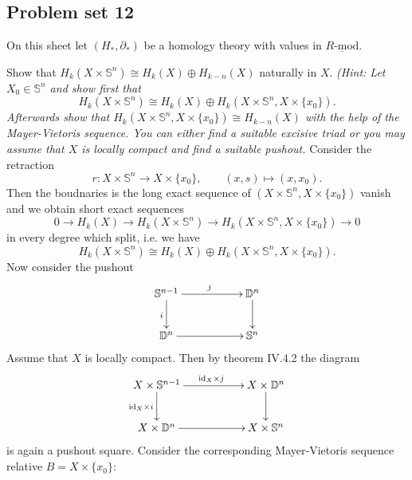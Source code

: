 \documentclass[11pt]{book}
\numberwithin{dummy}{section}
\theoremstyle{nonumberbreak}
\newenvironment{sol}[1][]{\ifthenelse{\equal{#1}{}}{\solution}{\solution[#1]}\rm}{\endsolution}
\newenvironment{prob}[1][]{\ifthenelse{\equal{#1}{}}{\problem}{\problem[#1]}\rm}{\endproblem}
\newcommand{\Rmod}{\underline{R\textrm{-}\mathrm{mod}}}
\newcommand{\Sph}{\mathbb{S}}
\newcommand{\la}{\longrightarrow}
\newcommand{\id}{\mathrm{id}}
\begin{document}
\begin{spacing}{1.4}
\newpage 



\titlespacing*{\section}{-16.5pt}{0pt}{20pt}
\renewcommand*\thesection{}
\section{Problem set 12} %
\renewcommand*\thesection{\arabic{section}}




On this sheet let $(H_*, \partial_*)$ be a homology theory with values in $\Rmod$.


\begin{prob} %
Show that $H_k(X \times \Sph^n) \cong H_k(X) \oplus H_{k-n}(X)$ naturally in $X$. \textit{(Hint: Let $X_0 \in \Sph^n$ and show first that}
$$H_k(X \times \Sph^n) \cong H_k(X) \oplus H_k(X \times \Sph^n, X \times \{x_0\}).$$
\textit{Afterwards show that $H_k(X \times \Sph^n, X \times \{x_0\}) \cong H_{k-n}(X)$ with the help of the Mayer-Vietoris sequence. You can either find a suitable excisive triad or you may assume that $X$ is locally compact and find a suitable pushout.}
\begin{sol}
Consider the retraction 
$$r: X \times \Sph^n \la X \times \{x_0\}, \qquad (x,s) \mapsto (x,x_0).$$
Then the boudnaries is the long exact sequence of $(X \times \Sph^n, X \times \{x_0\})$ vanish and we obtain short exact sequences
$$0 \la H_k(X) \la H_k(X \times \Sph^n) \la H_k(X \times \Sph^n, X \times \{x_0\}) \la 0$$
in every degree which split, i.e. we have 
$$H_k(X \times \Sph^n) \cong H_k(X) \oplus H_k(X \times \Sph^n, X \times \{x_0\}).$$
Now consider the pushout
$$
\begin{xy}
\xymatrix{
\Sph^{n-1} \ar[d]_{i} \ar[rr]^{j} && \mathbb{D}^n \ar[d] \\ \mathbb{D}^n \ar[rr] && \Sph^n
}
\end{xy}
$$
Assume that $X$ is locally compact. Then by theorem IV.4.2 the diagram
$$
\begin{xy}
\xymatrix{
X \times \Sph^{n-1} \ar[d]_{\id_X \times i} \ar[rr]^{\id_X \times j} && X \times \mathbb{D}^n \ar[d] \\ X \times  \mathbb{D}^n \ar[rr] && X\times \Sph^n
}
\end{xy}
$$
is again a pushout square. Consider the corresponding Mayer-Vietoris sequence relative $B=X \times \{x_0\}$:
$$
$$
\end{sol}
\end{prob}
\end{spacing}
\end{document}
